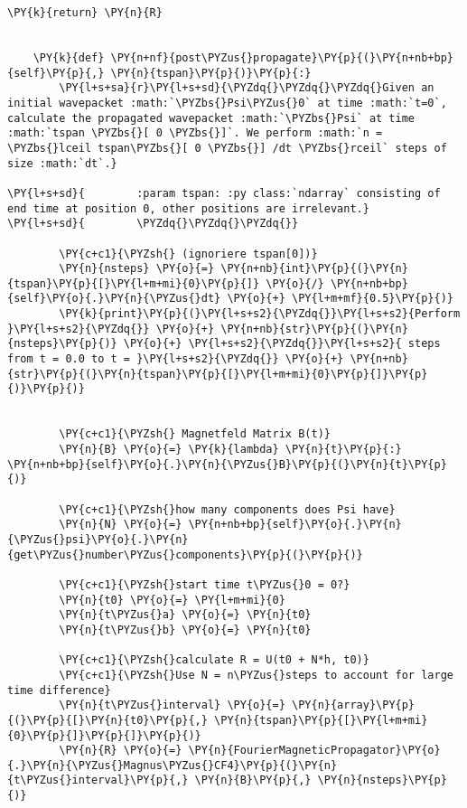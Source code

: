 \begin{Verbatim}[commandchars=\\\{\}]
        \PY{k}{return} \PY{n}{R}


    \PY{k}{def} \PY{n+nf}{post\PYZus{}propagate}\PY{p}{(}\PY{n+nb+bp}{self}\PY{p}{,} \PY{n}{tspan}\PY{p}{)}\PY{p}{:}
        \PY{l+s+sa}{r}\PY{l+s+sd}{\PYZdq{}\PYZdq{}\PYZdq{}Given an initial wavepacket :math:`\PYZbs{}Psi\PYZus{}0` at time :math:`t=0`, calculate the propagated wavepacket :math:`\PYZbs{}Psi` at time :math:`tspan \PYZbs{}[ 0 \PYZbs{}]`. We perform :math:`n = \PYZbs{}lceil tspan\PYZbs{}[ 0 \PYZbs{}] /dt \PYZbs{}rceil` steps of size :math:`dt`.}

\PY{l+s+sd}{        :param tspan: :py class:`ndarray` consisting of end time at position 0, other positions are irrelevant.}
\PY{l+s+sd}{        \PYZdq{}\PYZdq{}\PYZdq{}}

        \PY{c+c1}{\PYZsh{} (ignoriere tspan[0])}
        \PY{n}{nsteps} \PY{o}{=} \PY{n+nb}{int}\PY{p}{(}\PY{n}{tspan}\PY{p}{[}\PY{l+m+mi}{0}\PY{p}{]} \PY{o}{/} \PY{n+nb+bp}{self}\PY{o}{.}\PY{n}{\PYZus{}dt} \PY{o}{+} \PY{l+m+mf}{0.5}\PY{p}{)}
        \PY{k}{print}\PY{p}{(}\PY{l+s+s2}{\PYZdq{}}\PY{l+s+s2}{Perform }\PY{l+s+s2}{\PYZdq{}} \PY{o}{+} \PY{n+nb}{str}\PY{p}{(}\PY{n}{nsteps}\PY{p}{)} \PY{o}{+} \PY{l+s+s2}{\PYZdq{}}\PY{l+s+s2}{ steps from t = 0.0 to t = }\PY{l+s+s2}{\PYZdq{}} \PY{o}{+} \PY{n+nb}{str}\PY{p}{(}\PY{n}{tspan}\PY{p}{[}\PY{l+m+mi}{0}\PY{p}{]}\PY{p}{)}\PY{p}{)}


        \PY{c+c1}{\PYZsh{} Magnetfeld Matrix B(t)}
        \PY{n}{B} \PY{o}{=} \PY{k}{lambda} \PY{n}{t}\PY{p}{:} \PY{n+nb+bp}{self}\PY{o}{.}\PY{n}{\PYZus{}B}\PY{p}{(}\PY{n}{t}\PY{p}{)}

        \PY{c+c1}{\PYZsh{}how many components does Psi have}
        \PY{n}{N} \PY{o}{=} \PY{n+nb+bp}{self}\PY{o}{.}\PY{n}{\PYZus{}psi}\PY{o}{.}\PY{n}{get\PYZus{}number\PYZus{}components}\PY{p}{(}\PY{p}{)}

        \PY{c+c1}{\PYZsh{}start time t\PYZus{}0 = 0?}
        \PY{n}{t0} \PY{o}{=} \PY{l+m+mi}{0}
        \PY{n}{t\PYZus{}a} \PY{o}{=} \PY{n}{t0}
        \PY{n}{t\PYZus{}b} \PY{o}{=} \PY{n}{t0}

        \PY{c+c1}{\PYZsh{}calculate R = U(t0 + N*h, t0)}
        \PY{c+c1}{\PYZsh{}Use N = n\PYZus{}steps to account for large time difference}
        \PY{n}{t\PYZus{}interval} \PY{o}{=} \PY{n}{array}\PY{p}{(}\PY{p}{[}\PY{n}{t0}\PY{p}{,} \PY{n}{tspan}\PY{p}{[}\PY{l+m+mi}{0}\PY{p}{]}\PY{p}{]}\PY{p}{)}
        \PY{n}{R} \PY{o}{=} \PY{n}{FourierMagneticPropagator}\PY{o}{.}\PY{n}{\PYZus{}Magnus\PYZus{}CF4}\PY{p}{(}\PY{n}{t\PYZus{}interval}\PY{p}{,} \PY{n}{B}\PY{p}{,} \PY{n}{nsteps}\PY{p}{)}


\end{Verbatim}
